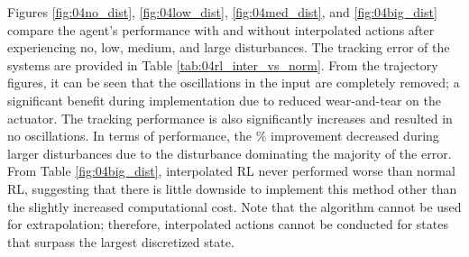 Figures \ref{fig:04no_dist}, \ref{fig:04low_dist}, \ref{fig:04med_dist}, and \ref{fig:04big_dist} compare the agent's performance with and without interpolated actions after experiencing no, low, medium, and large disturbances.  The tracking error of the systems are provided in Table \ref{tab:04rl_inter_vs_norm}.  From the trajectory figures, it can be seen that the oscillations in the input are completely removed; a significant benefit during implementation due to reduced wear-and-tear on the actuator.  The tracking performance is also significantly increases and resulted in no oscillations.  In terms of performance, the \% improvement decreased during larger disturbances due to the disturbance dominating the majority of the error. From Table \ref{fig:04big_dist}, interpolated RL never performed worse than normal RL, suggesting that there is little downside to implement this method other than the slightly increased computational cost.  Note that the algorithm cannot be used for extrapolation; therefore, interpolated actions cannot be conducted for states that surpass the largest discretized state.

